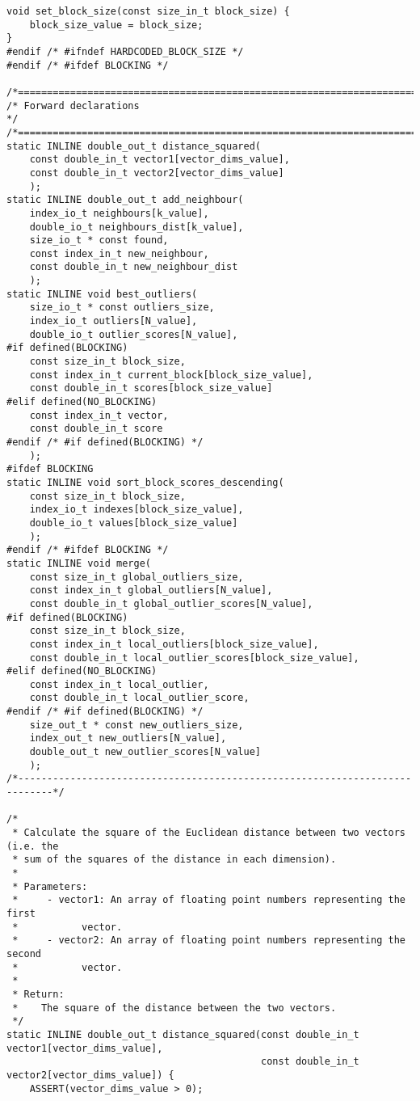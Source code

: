 \begin{lstlisting}
void set_block_size(const size_in_t block_size) {
    block_size_value = block_size;
}
#endif /* #ifndef HARDCODED_BLOCK_SIZE */
#endif /* #ifdef BLOCKING */

/*============================================================================*/
/* Forward declarations                                                       */
/*============================================================================*/
static INLINE double_out_t distance_squared(
    const double_in_t vector1[vector_dims_value],
    const double_in_t vector2[vector_dims_value]
    );
static INLINE double_out_t add_neighbour(
    index_io_t neighbours[k_value],
    double_io_t neighbours_dist[k_value],
    size_io_t * const found,
    const index_in_t new_neighbour,
    const double_in_t new_neighbour_dist
    );
static INLINE void best_outliers(
    size_io_t * const outliers_size,
    index_io_t outliers[N_value],
    double_io_t outlier_scores[N_value],
#if defined(BLOCKING)
    const size_in_t block_size,
    const index_in_t current_block[block_size_value],
    const double_in_t scores[block_size_value]
#elif defined(NO_BLOCKING)
    const index_in_t vector,
    const double_in_t score
#endif /* #if defined(BLOCKING) */
    );
#ifdef BLOCKING
static INLINE void sort_block_scores_descending(
    const size_in_t block_size,
    index_io_t indexes[block_size_value],
    double_io_t values[block_size_value]
    );
#endif /* #ifdef BLOCKING */
static INLINE void merge(
    const size_in_t global_outliers_size,
    const index_in_t global_outliers[N_value],
    const double_in_t global_outlier_scores[N_value],
#if defined(BLOCKING)
    const size_in_t block_size,
    const index_in_t local_outliers[block_size_value],
    const double_in_t local_outlier_scores[block_size_value],
#elif defined(NO_BLOCKING)
    const index_in_t local_outlier,
    const double_in_t local_outlier_score,
#endif /* #if defined(BLOCKING) */
    size_out_t * const new_outliers_size,
    index_out_t new_outliers[N_value],
    double_out_t new_outlier_scores[N_value]
    );
/*----------------------------------------------------------------------------*/

/*
 * Calculate the square of the Euclidean distance between two vectors (i.e. the
 * sum of the squares of the distance in each dimension).
 *
 * Parameters:
 *     - vector1: An array of floating point numbers representing the first
 *           vector.
 *     - vector2: An array of floating point numbers representing the second
 *           vector.
 *
 * Return:
 *    The square of the distance between the two vectors.
 */
static INLINE double_out_t distance_squared(const double_in_t vector1[vector_dims_value],
                                            const double_in_t vector2[vector_dims_value]) {
    ASSERT(vector_dims_value > 0);
    

\end{lstlisting}
